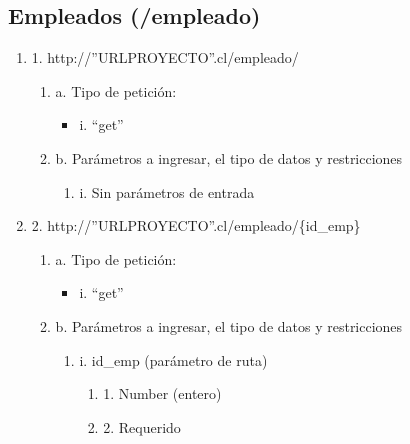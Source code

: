 \subsection{Empleados (/empleado)}

\begin{enumerate}
    \item 1. http://”URLPROYECTO”.cl/empleado/
    \begin{enumerate}
        \item a. Tipo de petición:
            \begin{itemize}
               \item i. “get”
            \end{itemize}
        \item b. Parámetros a ingresar, el tipo de datos y restricciones
            \begin{enumerate}
                \item i. Sin parámetros de entrada
            \end{enumerate}
    \end{enumerate}

    \item 2. http://”URLPROYECTO”.cl/empleado/\{id\_emp\}
    \begin{enumerate}
        \item a. Tipo de petición:
            \begin{itemize}
               \item i. “get”
            \end{itemize}
        \item b. Parámetros a ingresar, el tipo de datos y restricciones
            \begin{enumerate}
                \item i. id\_emp (parámetro de ruta)
                    \begin{enumerate}
                        \item 1. Number (entero)
                        \item 2. Requerido
                    \end{enumerate}
            \end{enumerate}
    \end{enumerate}


\end{enumerate}
